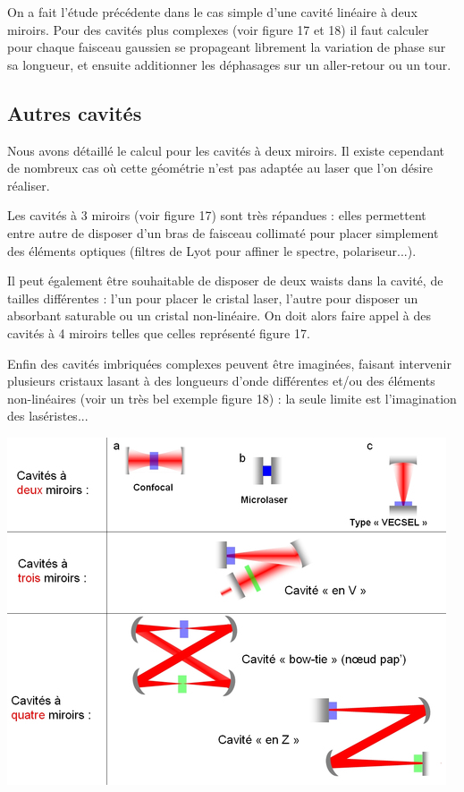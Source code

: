 \documentclass{book}
\begin{document}
On a fait l'étude précédente dans le cas simple d'une cavité linéaire à deux miroirs. Pour des cavités plus complexes (voir figure 17 et 18) il faut calculer pour chaque faisceau gaussien se propageant librement la variation de phase sur sa longueur, et ensuite additionner les déphasages sur un aller-retour ou un tour.

\subsection{Autres cavités}

Nous avons détaillé le calcul pour les cavités à deux miroirs. Il existe cependant de nombreux cas où cette géométrie n'est pas adaptée au laser que l'on désire réaliser.

Les cavités à 3 miroirs (voir figure 17) sont très répandues : elles permettent entre autre de disposer d'un bras de faisceau collimaté pour placer simplement des éléments optiques (filtres de Lyot pour affiner le spectre, polariseur...).

Il peut également être souhaitable de disposer de deux waists dans la cavité, de tailles différentes : l'un pour placer le cristal laser, l'autre pour disposer un absorbant saturable ou un cristal non-linéaire. On doit alors faire appel à des cavités à 4 miroirs telles que celles représenté figure 17.

Enfin des cavités imbriquées complexes peuvent être imaginées, faisant intervenir plusieurs cristaux lasant à des longueurs d'onde différentes et/ou des éléments non-linéaires (voir un très bel exemple figure 18) : la seule limite est l'imagination des laséristes...

{\centering
\includegraphics[scale=1.7]{images/fig17.jpg}
\par}
\end{document}
